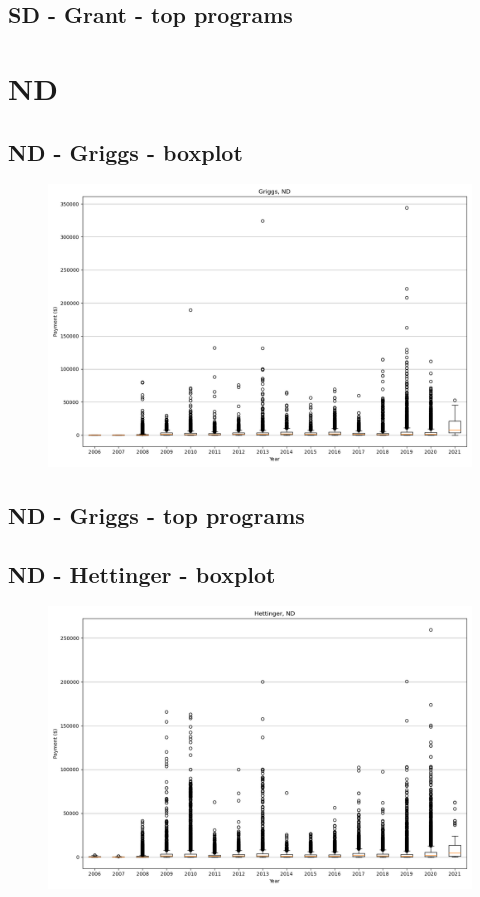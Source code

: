 \subsection*{SD - Grant - top programs}

\newpage
\section*{ND}
\subsection*{ND - Griggs - boxplot}
\begin{figure}[h]
\centering
\includegraphics[width=7in]{../output/boxplots/counties/Griggs-ND_boxplot.png}
\end{figure}


\subsection*{ND - Griggs - top programs}

\newpage
\subsection*{ND - Hettinger - boxplot}
\begin{figure}[h]
\centering
\includegraphics[width=7in]{../output/boxplots/counties/Hettinger-ND_boxplot.png}
\end{figure}


